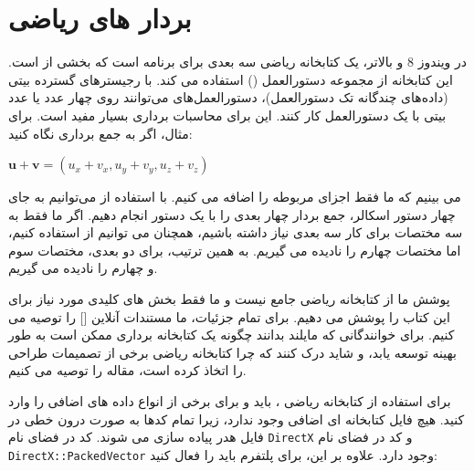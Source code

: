 \section{\textbf{بردار های ریاضی }}
\label{sec:1.6}
{
    \Large
    \begin{spacing}{1.5}
        در ویندوز 8 و بالاتر،  یک کتابخانه ریاضی سه بعدی برای برنامه  است که بخشی از  است.
        این کتابخانه از مجموعه دستورالعمل  () استفاده می کند.
        با رجیسترهای  گسترده  بیتی (داده‌های چندگانه تک دستورالعمل)، دستورالعمل‌های  می‌توانند روی چهار عدد  یا عدد   بیتی با یک دستورالعمل کار کنند.
        این برای محاسبات برداری بسیار مفید است. برای مثال، اگر به جمع برداری نگاه کنید:

        \begin{center}
            $\textbf{u}+\textbf{v}=(u_{x}+v_{x},u_{y}+v_{y},u_{z}+v_{z})$
        \end{center}

        می بینیم که ما فقط اجزای مربوطه را اضافه می کنیم.
        با استفاده از  می‌توانیم به جای چهار دستور اسکالر، جمع بردار چهار بعدی را با یک دستور  انجام دهیم.
        اگر ما فقط به سه مختصات برای کار سه بعدی نیاز داشته باشیم، همچنان می توانیم از  استفاده کنیم، اما مختصات چهارم را نادیده می گیریم.
        به همین ترتیب، برای دو بعدی، مختصات سوم و چهارم را نادیده می گیریم.

        پوشش ما از کتابخانه ریاضی  جامع نیست و ما فقط بخش های کلیدی مورد نیاز برای این کتاب را پوشش می دهیم.
        برای تمام جزئیات، ما مستندات آنلاین [] را توصیه می کنیم.
        برای خوانندگانی که مایلند بدانند چگونه یک کتابخانه برداری  ممکن است به طور بهینه توسعه یابد، و شاید درک کنند که چرا کتابخانه ریاضی  برخی از تصمیمات طراحی را اتخاذ کرده است،
        مقاله  را توصیه می کنیم.

        برای استفاده از کتابخانه ریاضی ، باید  و برای برخی از انواع داده های اضافی  را وارد کنید.
        هیچ فایل کتابخانه ای اضافی وجود ندارد، زیرا تمام کدها به صورت درون خطی در فایل هدر پیاده سازی می شوند.
        کد  در فضای نام \texttt{DirectX} و کد  در فضای نام \texttt{DirectX::PackedVector} وجود دارد.
        علاوه بر این، برای پلتفرم  باید  را فعال کنید:


\end{spacing}}
